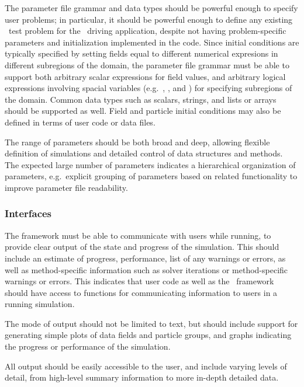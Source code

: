 \documentclass[10pt,twocolumn]{article}
\begin{document}
The parameter file grammar and data types should be powerful enough to
specify user problems; in particular, it should be powerful enough to
define any existing \enzo\ test problem for the \enzoii\ driving
application, despite not having problem-specific parameters and
initialization implemented in the code.  Since initial conditions are
typically specified by setting fields equal to different numerical
expresions in different subregions of the domain, the parameter file
grammar must be able to support both arbitrary scalar expressions for
field values, and arbitrary logical expressions involving spacial
variables (e.g.~, , and ) for specifying
subregions of the domain.  Common data types such as scalars, strings,
and lists or arrays should be supported as well.  Field and particle
initial conditions may also be defined in terms of user code or data
files.

The range of parameters should be both broad and deep, allowing
flexible definition of simulations and detailed control of data
structures and methods.  The expected large number of parameters
indicates a hierarchical organization of parameters, e.g.~explicit
grouping of parameters based on related functionality to improve
parameter file readability.

\subsubsection{Interfaces} \label{sss:require-interfaces}

The framework must be able to communicate with users while running, to
provide clear output of the state and progress of the simulation.
This should include an estimate of progress, performance, list of any
warnings or errors, as well as method-specific information such as
solver iterations or method-specific warnings or errors.  This
indicates that user code as well as the \cello\ framework should have
access to functions for communicating information to users in a
running simulation.

The mode of output should not be limited to text, but should include
support for generating simple plots of data fields and particle
groups, and graphs indicating the progress or performance of the
simulation.

All output should be easily accessible to the user, and include
varying levels of detail, from high-level summary information to more
in-depth detailed data.
\end{document}
